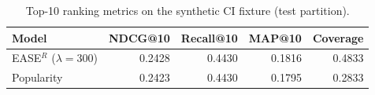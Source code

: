 \begin{table}[h]
\centering
\caption{Top-10 ranking metrics on the synthetic CI fixture (test partition).}
\label{tab:results}
\begin{tabular}{lrrrr}
\toprule
Model & NDCG@10 & Recall@10 & MAP@10 & Coverage \\
\midrule
EASE$^R$ ($\lambda{=}300$) & 0.2428 & 0.4430 & 0.1816 & 0.4833 \\
Popularity                 & 0.2423 & 0.4430 & 0.1795 & 0.2833 \\
\bottomrule
\end{tabular}
\end{table}
